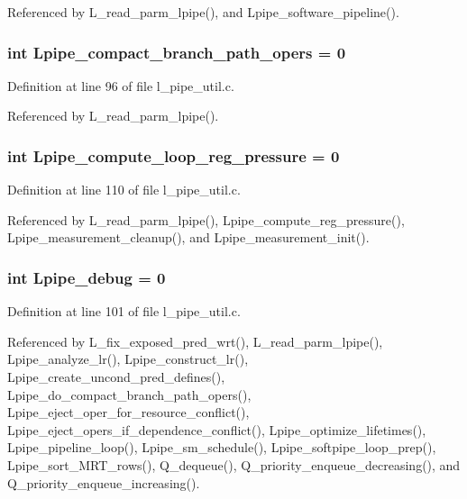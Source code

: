 Referenced by L\_\-read\_\-parm\_\-lpipe(), and Lpipe\_\-software\_\-pipeline().
\subsubsection{\setlength{\rightskip}{0pt plus 5cm}int \bf{Lpipe\_\-compact\_\-branch\_\-path\_\-opers} = 0}\label{l__pipe__util_8c_86f23e88bb2635324fa313d64bb50971}




Definition at line 96 of file l\_\-pipe\_\-util.c.

Referenced by L\_\-read\_\-parm\_\-lpipe().
\subsubsection{\setlength{\rightskip}{0pt plus 5cm}int \bf{Lpipe\_\-compute\_\-loop\_\-reg\_\-pressure} = 0}\label{l__pipe__util_8c_05b449c92ca8c59d61db6054cd56e7ee}




Definition at line 110 of file l\_\-pipe\_\-util.c.

Referenced by L\_\-read\_\-parm\_\-lpipe(), Lpipe\_\-compute\_\-reg\_\-pressure(), Lpipe\_\-measurement\_\-cleanup(), and Lpipe\_\-measurement\_\-init().
\subsubsection{\setlength{\rightskip}{0pt plus 5cm}int \bf{Lpipe\_\-debug} = 0}\label{l__pipe__util_8c_ad83dd0fea79c90886829873235d97be}




Definition at line 101 of file l\_\-pipe\_\-util.c.

Referenced by L\_\-fix\_\-exposed\_\-pred\_\-wrt(), L\_\-read\_\-parm\_\-lpipe(), Lpipe\_\-analyze\_\-lr(), Lpipe\_\-construct\_\-lr(), Lpipe\_\-create\_\-uncond\_\-pred\_\-defines(), Lpipe\_\-do\_\-compact\_\-branch\_\-path\_\-opers(), Lpipe\_\-eject\_\-oper\_\-for\_\-resource\_\-conflict(), Lpipe\_\-eject\_\-opers\_\-if\_\-dependence\_\-conflict(), Lpipe\_\-optimize\_\-lifetimes(), Lpipe\_\-pipeline\_\-loop(), Lpipe\_\-sm\_\-schedule(), Lpipe\_\-softpipe\_\-loop\_\-prep(), Lpipe\_\-sort\_\-MRT\_\-rows(), Q\_\-dequeue(), Q\_\-priority\_\-enqueue\_\-decreasing(), and Q\_\-priority\_\-enqueue\_\-increasing().
